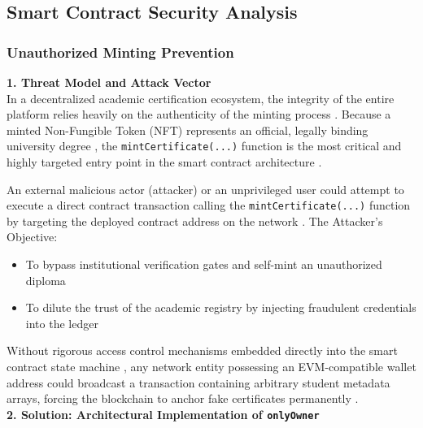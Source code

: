 \subsection{Smart Contract Security Analysis}

\subsubsection{Unauthorized Minting Prevention}

\textbf{1. Threat Model and Attack Vector}\\

In a decentralized academic certification ecosystem, the integrity of the entire platform relies heavily on the authenticity of the minting process \cite{blockchainineducation}. Because a minted Non-Fungible Token (NFT) represents an official, legally binding university degree \cite{fairfield2022tokenized}, the \texttt{mintCertificate(...)} function is the most critical and highly targeted entry point in the smart contract architecture \cite{perez2020smartcontracts}.\newline

An external malicious actor (attacker) or an unprivileged user could attempt to execute a direct contract transaction calling the \texttt{mintCertificate(...)} function by targeting the deployed contract address on the network \cite{rojalina2025verifichain}. The Attacker's Objective:

\begin{itemize}
    \item To bypass institutional verification gates and self-mint an unauthorized diploma \cite{khati2023studentcert}

    \item To dilute the trust of the academic registry by injecting fraudulent credentials into the ledger \cite{kumutha2021blockchainacdaemic}
\end{itemize}

Without rigorous access control mechanisms embedded directly into the smart contract state machine \cite{openzeppelin2026erc721}, any network entity possessing an EVM-compatible wallet address could broadcast a transaction containing arbitrary student metadata arrays, forcing the blockchain to anchor fake certificates permanently \cite{xiongfei2022nftcert}.\\

\textbf{2. Solution: Architectural Implementation of \texttt{onlyOwner}}\\

